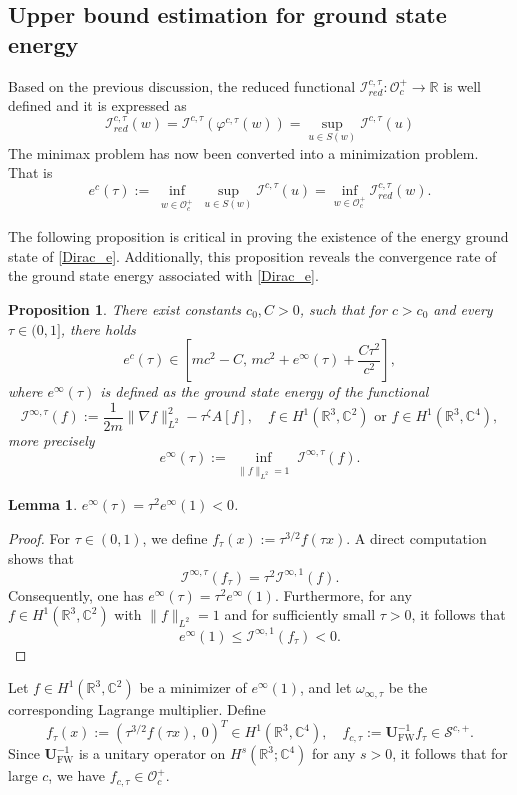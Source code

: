 \documentclass{amsart}
\theoremstyle{plain}
\newtheorem{proposition}[theorem]{Proposition}
\newtheorem{lemma}[theorem]{Lemma}
\theoremstyle{definition}
\theoremstyle{remark}
\numberwithin{equation}{section} \numberwithin{figure}{section}
\begin{document}
\subsection{Upper bound estimation for ground state energy}\label{appendix_1}
Based on the previous discussion, the reduced functional $\mathcal{I }_{red}^{c,\tau}  :\mathcal{O}_c^+ \rightarrow \mathbb{R}$  is well defined and it is expressed as 
$$
\mathcal{I }_{red}^{c,\tau}  (w)=\mathcal{I}^{c, \tau }\left(\varphi^{c, \tau}(w)\right)=\sup _{{u} \in   S(w)} \mathcal{I}^{c, \tau }({u})$$
The minimax problem has now been converted into a minimization problem. That is
$$
e^c(\tau):=\inf _{\substack{w \in \mathcal{O}_c^+  }} \sup _{{u} \in   S(w)} \mathcal{I}^{c, \tau }({u})=\inf _{w \in \mathcal{O}_c^{+}} \mathcal{I }_{red}^{c,\tau}  (w).
$$
 
The following proposition is critical in proving the
 existence of the energy ground state of \eqref{Dirac_e}. Additionally, this proposition reveals the convergence rate of the ground state energy associated with \eqref{Dirac_e}.
 
\begin{proposition}\label{mulp}
   There exist constants $c_0, C>0$, such that for $c>c_0$ and every  $\tau\in (0,1]$, there holds   $$e^c(\tau)\in\left[mc^2 - C,\,mc^2 + e^{\infty}(\tau)+ \frac{C \tau^2}{c^2}\right],$$
   where $e^{\infty}(\tau)$ is defined as the ground state energy of the functional 
   $$
\mathcal{I}^{\infty, \tau}(f) := \frac{1}{2m}\|\nabla f\|_{L^2}^2 - \tau^{\zeta} A[f], \quad f\in H^1(\mathbb{R}^3, \mathbb{C}^2) \,\,\text{or}\,\,f\in H^1(\mathbb{R}^3, \mathbb{C}^4),
$$
more precisely
   $$
   e^{\infty}(\tau):=\inf_{\substack{\|f\|_{L^2}=1}}\mathcal{I}^{\infty, \tau}(f).
   $$
\end{proposition}

\begin{lemma}\label{AA_1}
  $e^\infty(\tau)=\tau^2 e^\infty(1)<0$.
\end{lemma}
\begin{proof}
 For $\tau \in (0,1)$, we define $f_\tau(x) := \tau^{3/2} f(\tau x)$. A direct computation shows that
 \[
 \mathcal{I}^{\infty, \tau}(f_\tau) = \tau^2 \mathcal{I}^{\infty, 1}(f).
 \]
 Consequently, one has $e^\infty(\tau) = \tau^2 e^\infty(1)$. Furthermore, for any $f\in H^1(\mathbb{R}^3, \mathbb{C}^2)$ with $\|f\|_{L^2} = 1$ and for sufficiently small $\tau > 0$, it follows that
 \[
 e^\infty(1) \le \mathcal{I}^{\infty, 1}(f_\tau) < 0.
 \]
\end{proof}
Let \( f \in H^1(\mathbb{R}^3, \mathbb{C}^2) \) be a minimizer of \( e^{\infty}(1) \), and let \( \omega_{\infty,\tau} \) be the corresponding Lagrange multiplier. Define  
\begin{equation}\label{llp_d}
f_\tau(x) := \left( \tau^{3/2} f(\tau x),\ 0 \right)^T \in H^1(\mathbb{R}^3, \mathbb{C}^4), \quad f_{c,\tau} := \mathbf{U}_{\mathrm{FW}}^{-1} f_\tau \in \mathcal{S}^{c,+}. 
\end{equation}
 Since \(\mathbf{U}_{\mathrm{FW}}^{-1}\) is a unitary operator on \(H^s(\mathbb{R}^3; \mathbb{C}^4)\) for any \(s > 0\), it follows that for large \(c\), we have
  \(
  f_{c,\tau} \in \mathcal{O}_c^+.
  \)
\end{document}
